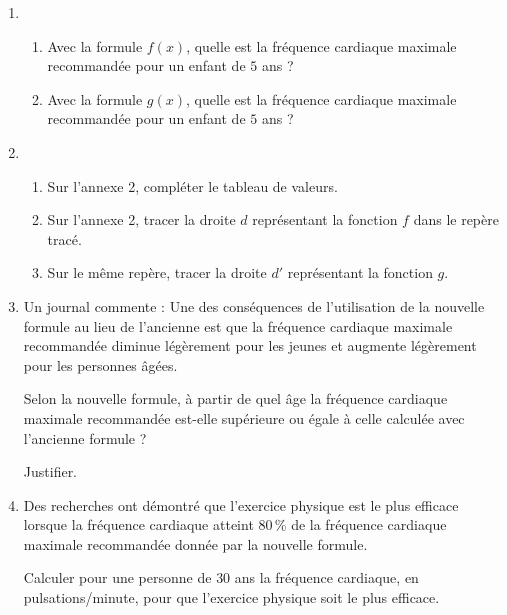 \documentclass[10pt]{article}
\begin{document}
\begin{enumerate}
\item 
	\begin{enumerate}
		\item Avec la formule $f(x)$, quelle est la fréquence cardiaque maximale recommandée pour un enfant de $5$ ans ?
		\item Avec la formule $g(x)$, quelle est la fréquence cardiaque maximale recommandée pour un enfant de $5$ ans ?
	\end{enumerate}
\item  
	\begin{enumerate}
		\item Sur l'annexe 2, compléter le tableau de valeurs.
		\item Sur l'annexe 2, tracer la droite $d$ représentant la fonction $f$ dans le repère tracé.
		\item Sur le même repère, tracer la droite $d'$ représentant la fonction $g$.
	\end{enumerate}
\item  Un journal commente : \og Une des conséquences de l'utilisation de la nouvelle formule au lieu de l'ancienne est que la fréquence cardiaque maximale recommandée diminue
légèrement pour les jeunes et augmente légèrement pour les personnes âgées. \fg
	
Selon la nouvelle formule, à partir de quel âge la fréquence cardiaque maximale
recommandée est-elle supérieure ou égale à celle calculée avec l'ancienne formule ?
	
Justifier.
\item  Des recherches ont démontré que l'exercice physique est le plus efficace lorsque la
fréquence cardiaque atteint 80\,\% de la fréquence cardiaque maximale recommandée
donnée par la nouvelle formule.
	
Calculer pour une personne de $30$ ans la fréquence cardiaque, en pulsations/minute, pour
que l'exercice physique soit le plus efficace.
\end{enumerate}

\vspace{0,5cm}
\end{document}
